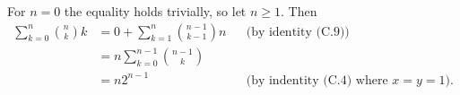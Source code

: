 For $n=0$ the equality holds trivially, so let $n\ge1$.
Then
\begin{align*}
    \sum_{k=0}^n\binom{n}{k}k &= 0+\sum_{k=1}^n\binom{n-1}{k-1}n && \text{(by identity (C.9))} \\
    &= n\sum_{k=0}^{n-1}\binom{n-1}{k} \\[1mm]
    &= n2^{n-1} && \text{(by indentity (C.4) where $x=y=1$)}.
\end{align*}
